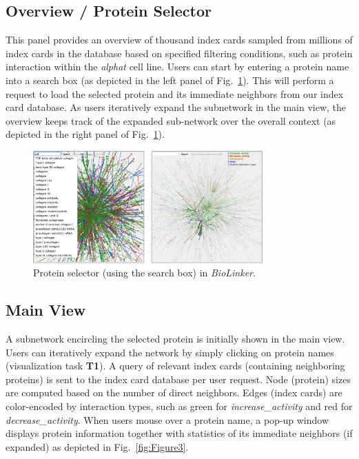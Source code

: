 \documentclass[journal]{vgtc}                %
\newcommand{\theName}{\textit{BioLinker}}
\begin{document}
\subsection{Overview / Protein Selector}
\label{sec:ProteinSelector}
This panel provides an overview of thousand index cards sampled from millions of index cards in the database based on specified filtering conditions, such as protein interaction within the \textit{alphat} cell line. Users can start by entering a protein name into a search box (as depicted in the left panel of Fig.~\ref{fig:Figure2}). This will perform a request to load the selected protein and its immediate neighbors from our index card database. As users iteratively expand the subnetwork in the main view, the overview keeps track of the expanded sub-network over the overall context (as depicted in the right panel of Fig.~\ref{fig:Figure2}).

\begin{figure}[h!]
  \centering
  \includegraphics[width=250pt]{figures/Figure2.png}
  \caption{Protein selector (using the search box) in \theName{}.}
  \label{fig:Figure2}
\end{figure}

\subsection{Main View}
\label{sec:MainView}
A subnetwork encircling the selected protein is initially shown in the main view. Users can iteratively expand the network by simply clicking on protein names (visualization task \textbf{T1}). A query of relevant index cards (containing neighboring proteins) is sent to the index card database per user request. Node (protein) sizes are computed based on the number of direct neighbors. Edges (index cards) are color-encoded by interaction types, such as green for \textit{increase\_activity} and red for \textit{decrease\_activity}. When users mouse over a protein name, a pop-up window displays protein information together with statistics of its immediate neighbors (if expanded) as depicted in Fig.~\ref{fig:Figure3}.
\end{document}
